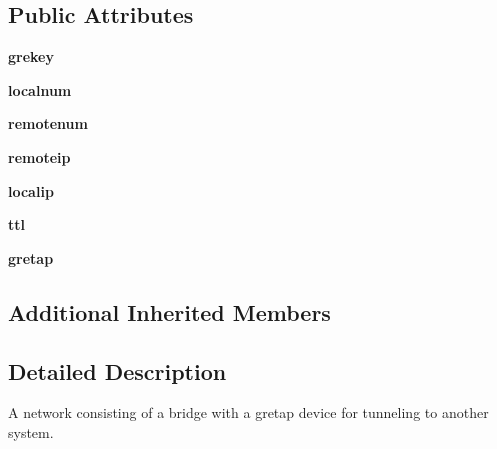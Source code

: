 \subsection*{Public Attributes}
\begin{DoxyCompactItemize}
\item 
\hypertarget{classcore_1_1netns_1_1vnet_1_1_gre_tap_bridge_a77cbf9c110009417dfc62f748d36546d}{{\bfseries grekey}}\label{classcore_1_1netns_1_1vnet_1_1_gre_tap_bridge_a77cbf9c110009417dfc62f748d36546d}

\item 
\hypertarget{classcore_1_1netns_1_1vnet_1_1_gre_tap_bridge_a6425991adfb394411aa8be91b30c24d2}{{\bfseries localnum}}\label{classcore_1_1netns_1_1vnet_1_1_gre_tap_bridge_a6425991adfb394411aa8be91b30c24d2}

\item 
\hypertarget{classcore_1_1netns_1_1vnet_1_1_gre_tap_bridge_a74d2ec2234c139c5e80f01ad1da15fe2}{{\bfseries remotenum}}\label{classcore_1_1netns_1_1vnet_1_1_gre_tap_bridge_a74d2ec2234c139c5e80f01ad1da15fe2}

\item 
\hypertarget{classcore_1_1netns_1_1vnet_1_1_gre_tap_bridge_a317640ca87f6ad9588a8d170badd72f4}{{\bfseries remoteip}}\label{classcore_1_1netns_1_1vnet_1_1_gre_tap_bridge_a317640ca87f6ad9588a8d170badd72f4}

\item 
\hypertarget{classcore_1_1netns_1_1vnet_1_1_gre_tap_bridge_a4ced73e21ea16b0df556e6ca68f6004d}{{\bfseries localip}}\label{classcore_1_1netns_1_1vnet_1_1_gre_tap_bridge_a4ced73e21ea16b0df556e6ca68f6004d}

\item 
\hypertarget{classcore_1_1netns_1_1vnet_1_1_gre_tap_bridge_adaa50e038c1ccead08d020fa97d320b0}{{\bfseries ttl}}\label{classcore_1_1netns_1_1vnet_1_1_gre_tap_bridge_adaa50e038c1ccead08d020fa97d320b0}

\item 
\hypertarget{classcore_1_1netns_1_1vnet_1_1_gre_tap_bridge_a9bbe3597e1fc285d843c207c7b1aac2c}{{\bfseries gretap}}\label{classcore_1_1netns_1_1vnet_1_1_gre_tap_bridge_a9bbe3597e1fc285d843c207c7b1aac2c}

\end{DoxyCompactItemize}
\subsection*{Additional Inherited Members}


\subsection{Detailed Description}
\begin{DoxyVerb}A network consisting of a bridge with a gretap device for tunneling to 
    another system.
\end{DoxyVerb}
 

